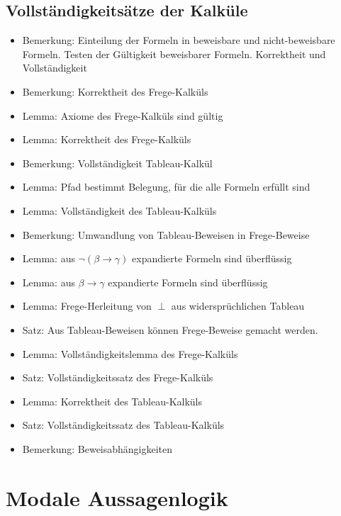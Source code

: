 \documentclass[8pt,fleqn,a4paper,twoside]{article}
\begin{document}
\begin{multicols}{2}
    \subsection{Vollständigkeitsätze der Kalküle} %
    \label{sub:vollständigkeitsätze_der_kalküle}
      \begin{itemize}
        \item Bemerkung: Einteilung der Formeln in beweisbare und nicht-beweisbare Formeln. Testen der Gültigkeit beweisbarer Formeln. Korrektheit und Vollständigkeit
        \item Bemerkung: Korrektheit des Frege-Kalküls
        \item Lemma: Axiome des Frege-Kalküls sind gültig
        \item Lemma: Korrektheit des Frege-Kalküls
        \item Bemerkung: Vollständigkeit Tableau-Kalkül
        \item Lemma: Pfad bestimmt Belegung, für die alle Formeln erfüllt sind
        \item Lemma: Vollständigkeit des Tableau-Kalküls
        \item Bemerkung: Umwandlung von Tableau-Beweisen in Frege-Beweise
        \item Lemma: aus $\lnot(β\to γ)$ expandierte Formeln sind überflüssig
        \item Lemma: aus $β\to γ$ expandierte Formeln sind überflüssig
        \item Lemma: Frege-Herleitung von $\perp$ aus widersprüchlichen Tableau
        \item Satz: Aus Tableau-Beweisen können Frege-Beweise gemacht werden.
        \item Lemma: Vollständigkeitslemma des Frege-Kalküls
        \item Satz: Vollständigkeitssatz des Frege-Kalküls
        \item Lemma: Korrektheit des Tableau-Kalküls
        \item Satz: Vollständigkeitssatz des Tableau-Kalküls
        \item Bemerkung: Beweisabhängigkeiten
      \end{itemize}


  \section{Modale Aussagenlogik} %
  \label{sec:modale_aussagenlogik}


\end{multicols}
\end{document}
